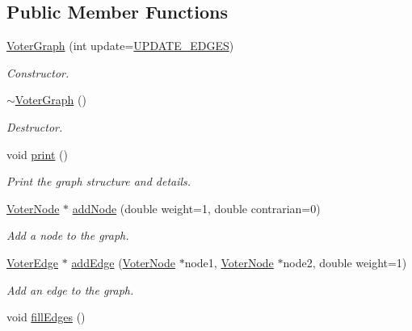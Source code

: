 \subsection*{Public Member Functions}
\begin{DoxyCompactItemize}
\item 
\hyperlink{class_voter_graph_aa5e00e0f2d2d8de10a217633d4594814}{Voter\+Graph} (int update=\hyperlink{voter__graph_8hpp_ab3bec55c359e4ed771339c8bc61fc35aa01d100088352e1a7d3a34c9a66d0f951}{U\+P\+D\+A\+T\+E\+\_\+\+E\+D\+G\+E\+S})
\begin{DoxyCompactList}\small\item\em Constructor. \end{DoxyCompactList}\item 
\hypertarget{class_voter_graph_a84a3f081c6e15cf8d1635d6ee6d5e51e}{}\hyperlink{class_voter_graph_a84a3f081c6e15cf8d1635d6ee6d5e51e}{$\sim$\+Voter\+Graph} ()\label{class_voter_graph_a84a3f081c6e15cf8d1635d6ee6d5e51e}

\begin{DoxyCompactList}\small\item\em Destructor. \end{DoxyCompactList}\item 
\hypertarget{class_voter_graph_aacb7bbd4bcc7f923b2784b0bcefcd1a3}{}void \hyperlink{class_voter_graph_aacb7bbd4bcc7f923b2784b0bcefcd1a3}{print} ()\label{class_voter_graph_aacb7bbd4bcc7f923b2784b0bcefcd1a3}

\begin{DoxyCompactList}\small\item\em Print the graph structure and details. \end{DoxyCompactList}\item 
\hyperlink{class_voter_node}{Voter\+Node} $\ast$ \hyperlink{class_voter_graph_af53017970f3ac08838b67f4a09171b92}{add\+Node} (double weight=1, double contrarian=0)
\begin{DoxyCompactList}\small\item\em Add a node to the graph. \end{DoxyCompactList}\item 
\hyperlink{class_voter_edge}{Voter\+Edge} $\ast$ \hyperlink{class_voter_graph_a1f6b8be82800577c45908102251f1e35}{add\+Edge} (\hyperlink{class_voter_node}{Voter\+Node} $\ast$node1, \hyperlink{class_voter_node}{Voter\+Node} $\ast$node2, double weight=1)
\begin{DoxyCompactList}\small\item\em Add an edge to the graph. \end{DoxyCompactList}\item 
\hypertarget{class_voter_graph_aa86a23e7d5984c3c6bbea76f193b73ae}{}void \hyperlink{class_voter_graph_aa86a23e7d5984c3c6bbea76f193b73ae}{fill\+Edges} ()\label{class_voter_graph_aa86a23e7d5984c3c6bbea76f193b73ae}


\end{DoxyCompactItemize}
